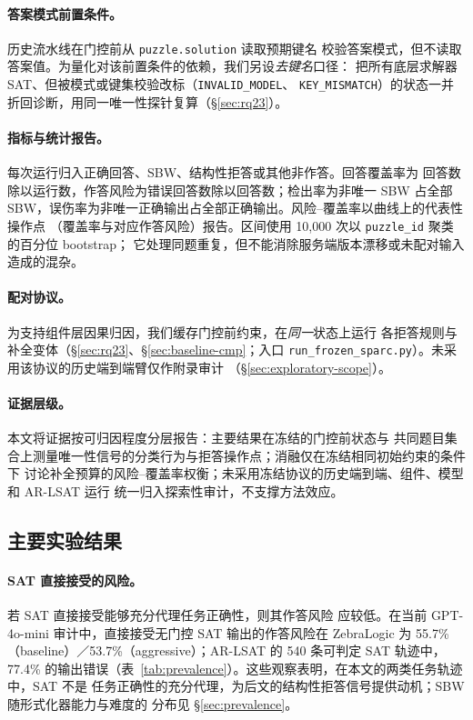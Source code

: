 \documentclass[letterpaper]{article}
\newcommand{\sbw}{SBW}
\begin{document}
\paragraph{答案模式前置条件。}历史流水线在门控前从 \texttt{puzzle.solution} 读取预期键名
校验答案模式，但不读取答案值。为量化对该前置条件的依赖，我们另设\emph{去键名}口径：
把所有底层求解器 SAT、但被模式或键集校验改标（\texttt{INVALID\_MODEL}、
\texttt{KEY\_MISMATCH}）的状态一并折回诊断，用同一唯一性探针复算（\S\ref{sec:rq23}）。

\paragraph{指标与统计报告。}每次运行归入正确回答、\sbw{}、结构性拒答或其他非作答。回答覆盖率为
回答数除以运行数，作答风险为错误回答数除以回答数；检出率为非唯一 \sbw{} 占全部
\sbw{}，误伤率为非唯一正确输出占全部正确输出。风险--覆盖率以曲线上的代表性操作点
（覆盖率与对应作答风险）报告。区间使用 10{,}000 次以 \texttt{puzzle\_id} 聚类的百分位 bootstrap；
它处理同题重复，但不能消除服务端版本漂移或未配对输入造成的混杂。

\paragraph{配对协议。}为支持组件层因果归因，我们缓存门控前约束，在\emph{同一}状态上运行
各拒答规则与补全变体（\S\ref{sec:rq23}、\S\ref{sec:baseline-cmp}；入口
\texttt{run\_frozen\_sparc.py}）。未采用该协议的历史端到端臂仅作附录审计
（\S\ref{sec:exploratory-scope}）。

\paragraph{证据层级。}本文将证据按可归因程度分层报告：主要结果在冻结的门控前状态与
共同题目集合上测量唯一性信号的分类行为与拒答操作点；消融仅在冻结相同初始约束的条件下
讨论补全预算的风险--覆盖率权衡；未采用冻结协议的历史端到端、组件、模型和 AR-LSAT 运行
统一归入探索性审计，不支撑方法效应。

\subsection{主要实验结果}
\label{sec:main-results}

\paragraph{SAT 直接接受的风险。}若 SAT 直接接受能够充分代理任务正确性，则其作答风险
应较低。在当前 GPT-4o-mini 审计中，直接接受无门控 SAT 输出的作答风险在 ZebraLogic 为
55.7\%（baseline）／53.7\%（aggressive）；AR-LSAT 的 540 条可判定 SAT 轨迹中，77.4\%
的输出错误（表~\ref{tab:prevalence}）。这些观察表明，在本文的两类任务轨迹中，SAT 不是
任务正确性的充分代理，为后文的结构性拒答信号提供动机；\sbw{} 随形式化器能力与难度的
分布见 \S\ref{sec:prevalence}。
\end{document}

